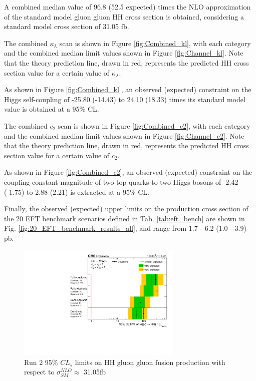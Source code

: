A combined median value of 96.8 (52.5 expected) times the NLO approximation of the standard model gluon gluon HH cross section is obtained, considering a standard model cross section of 31.05 fb. 

The combined $\kappa_{\lambda}$ scan is shown in Figure \ref{fig:Combined_kl}, with each category and the combined median limit values shown
in Figure \ref{fig:Channel_kl}. Note that the theory prediction line, drawn in red, represents the predicted HH cross section value for a certain value of $\kappa_{\lambda}$.

As shown in Figure \ref{fig:Combined_kl}, an observed (expected) constraint on the Higgs self-coupling of -25.80 (-14.43) to 24.10 (18.33) times its standard model value 
is obtained at a 95\% CL. 

The combined $c_{2}$ scan is shown in Figure \ref{fig:Combined_c2}, with each category and the combined median limit values shown
in Figure \ref{fig:Channel_c2}. Note that the theory prediction line, drawn in red, represents the predicted HH cross section value for a certain value of $c_{2}$.

As shown in Figure \ref{fig:Combined_c2}, an observed (expected) constraint on the coupling constant magnitude of two top quarks to two Higgs bosons of
-2.42 (-1.75) to 2.88 (2.21) is extracted at a 95\% CL.

Finally, the observed (expected) upper limits on the production cross section of the 20 EFT benchmark scenarios defined in Tab. \ref{tab:eft_bench} are shown in 
Fig. \ref{fig:20_EFT_benchmark_results_all}, and range from 1.7 - 6.2 (1.0 - 3.9) pb. 

\begin{figure}[!htbp]
  \centering
  \includegraphics[width=0.7\textwidth]{Images/Results/All_limits.pdf}
  \caption{Run 2 95\% $CL_{s}$ limits on HH gluon gluon fusion production with respect to $\sigma_{SM}^{NLO} \approx $ 31.05fb}
  \label{fig:Run2SMNLOCombined}
\end{figure}

